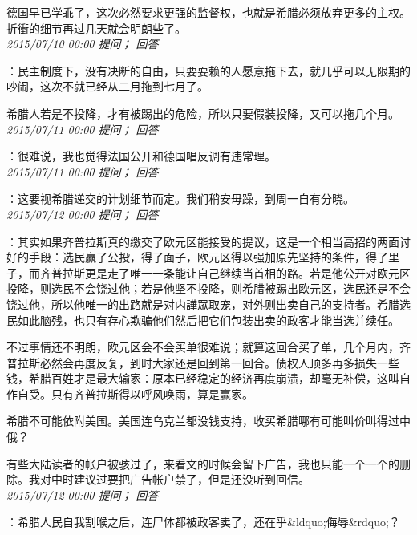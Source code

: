 \documentclass[twocolumn]{ctexart}
\begin{document}
德国早已学乖了，这次必然要求更强的监督权，也就是希腊必须放弃更多的主权。折衝的细节再过几天就会明朗些了。\\

\textit{\hfill\noindent\small 2015/07/10 00:00 提问； 回答}

：民主制度下，没有决断的自由，只要耍赖的人愿意拖下去，就几乎可以无限期的吵闹，这次不就已经从二月拖到七月了。

希腊人若是不投降，才有被踢出的危险，所以只要假装投降，又可以拖几个月。\\

\textit{\hfill\noindent\small 2015/07/11 00:00 提问； 回答}

：很难说，我也觉得法国公开和德国唱反调有违常理。\\

\textit{\hfill\noindent\small 2015/07/11 00:00 提问； 回答}

：这要视希腊递交的计划细节而定。我们稍安毋躁，到周一自有分晓。\\

\textit{\hfill\noindent\small 2015/07/12 00:00 提问； 回答}

：其实如果齐普拉斯真的缴交了欧元区能接受的提议，这是一个相当高招的两面讨好的手段：选民赢了公投，得了面子，欧元区得以强加原先坚持的条件，得了里子，而齐普拉斯更是走了唯一一条能让自己继续当首相的路。若是他公开对欧元区投降，则选民不会饶过他；若是他坚不投降，则希腊被踢出欧元区，选民还是不会饶过他，所以他唯一的出路就是对内譁眾取宠，对外则出卖自己的支持者。希腊选民如此脑残，也只有存心欺骗他们然后把它们包装出卖的政客才能当选并续任。

不过事情还不明朗，欧元区会不会买单很难说；就算这回合买了单，几个月内，齐普拉斯必然会再度反复，到时大家还是回到第一回合。债权人顶多再多损失一些钱，希腊百姓才是最大输家：原本已经稳定的经济再度崩溃，却毫无补偿，这叫自作自受。只有齐普拉斯得以呼风唤雨，算是赢家。

希腊不可能依附美国。美国连乌克兰都没钱支持，收买希腊哪有可能叫价叫得过中俄？

有些大陆读者的帐户被骇过了，来看文的时候会留下广告，我也只能一个一个的删除。我对中时建议过要把广告帐户禁了，但是还没听到回信。\\

\textit{\hfill\noindent\small 2015/07/12 00:00 提问； 回答}

：希腊人民自我割喉之后，连尸体都被政客卖了，还在乎\&ldquo;侮辱\&rdquo;？\\
\end{document}
